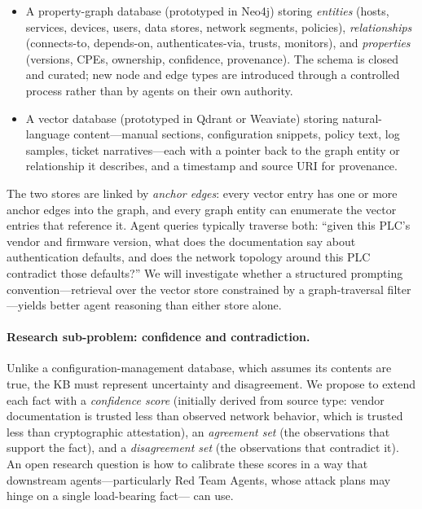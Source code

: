 \begin{itemize}[leftmargin=1.3em,itemsep=0.1em,topsep=0.2em]
  \item A property-graph database (prototyped in Neo4j) storing
  \emph{entities} (hosts, services, devices, users, data stores,
  network segments, policies), \emph{relationships} (connects-to,
  depends-on, authenticates-via, trusts, monitors), and
  \emph{properties} (versions, CPEs, ownership, confidence, provenance).
  The schema is closed and curated; new node and edge types are
  introduced through a controlled process rather than by agents on
  their own authority.
  \item A vector database (prototyped in Qdrant or Weaviate) storing
  natural-language content---manual sections, configuration snippets,
  policy text, log samples, ticket narratives---each with a pointer
  back to the graph entity or relationship it describes, and a
  timestamp and source URI for provenance.
\end{itemize}

The two stores are linked by \emph{anchor edges}: every vector entry
has one or more anchor edges into the graph, and every graph entity
can enumerate the vector entries that reference it. Agent queries
typically traverse both: ``given this PLC's vendor and firmware
version, what does the documentation say about authentication defaults,
and does the network topology around this PLC contradict those
defaults?'' We will investigate whether a structured prompting
convention---retrieval over the vector store constrained by a
graph-traversal filter---yields better agent reasoning than either
store alone.

\paragraph{Research sub-problem: confidence and contradiction.}
Unlike a configuration-management database, which assumes its contents
are true, the \sysname KB must represent uncertainty and disagreement.
We propose to extend each fact with a \emph{confidence score}
(initially derived from source type: vendor documentation is trusted
less than observed network behavior, which is trusted less than
cryptographic attestation), an \emph{agreement set} (the observations
that support the fact), and a \emph{disagreement set} (the observations
that contradict it). An open research question is how to calibrate
these scores in a way that downstream agents---particularly Red Team
Agents, whose attack plans may hinge on a single load-bearing fact---
can use.

